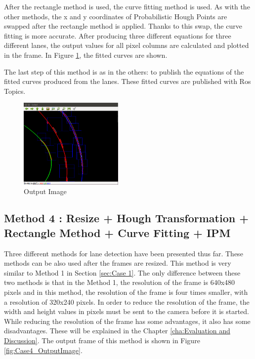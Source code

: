 After the rectangle method is used, the curve fitting method is used. As with the other methods, the x and y coordinates of Probabilistic Hough Points are swapped after the rectangle method is applied. Thanks to this swap, the curve fitting is more accurate. After producing three different equations for three different lanes, the output values for all pixel columns are calculated and plotted in the frame. In Figure \ref{fig:Case3_OutputImage}, the fitted curves are shown.

The last step of this method is as in the others: to publish the equations of the fitted curves produced from the lanes. These fitted curves are published with Ros Topics.

\begin{figure}[H]
 \centering
  \includegraphics[width=0.45\textwidth]{./Bilder/Case3_OutputImage.png}
	\caption{Output Image}
	\label{fig:Case3_OutputImage}
\end{figure}



\subsection{Method 4 : Resize + Hough Transformation + Rectangle Method + Curve Fitting + IPM}\label{sec:Case 4}


Three different methods for lane detection have been presented thus far. These methods can be also used after the frames are resized. This method is very similar to Method 1 in Section \ref{sec:Case 1}. The only difference between these two methods is that in the Method 1, the resolution of the frame is 640x480 pixels and in this method, the resolution of the frame is four times smaller, with a resolution of 320x240 pixels. In order to reduce the resolution of the frame, the width and height values in pixels must be sent to the camera before it is started. While reducing the resolution of the frame has some advantages, it also has some disadvantages. These will be explained in the Chapter \ref{cha:Evaluation and Discussion}. The output frame of this method is shown in Figure \ref{fig:Case4_OutputImage}.


